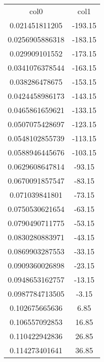 \begin{table}

\begin{tabular}{cc}

col0 & col1 \\

0.021451811205 & -193.15 \\

0.0256905886318 & -183.15 \\

0.029909101552 & -173.15 \\

0.0341076378544 & -163.15 \\

0.038286478675 & -153.15 \\

0.0424458986173 & -143.15 \\

0.0465861659621 & -133.15 \\

0.0507075428697 & -123.15 \\

0.0548102855739 & -113.15 \\

0.0588946445676 & -103.15 \\

0.0629608647814 & -93.15 \\

0.0670091857547 & -83.15 \\

0.071039841801 & -73.15 \\

0.0750530621654 & -63.15 \\

0.0790490711775 & -53.15 \\

0.0830280883971 & -43.15 \\

0.0869903287553 & -33.15 \\

0.0909360026898 & -23.15 \\

0.0948653162757 & -13.15 \\

0.0987784713505 & -3.15 \\

0.102675665636 & 6.85 \\

0.106557092853 & 16.85 \\

0.110422942836 & 26.85 \\

0.114273401641 & 36.85 \\

\end{tabular}

\end{table}


